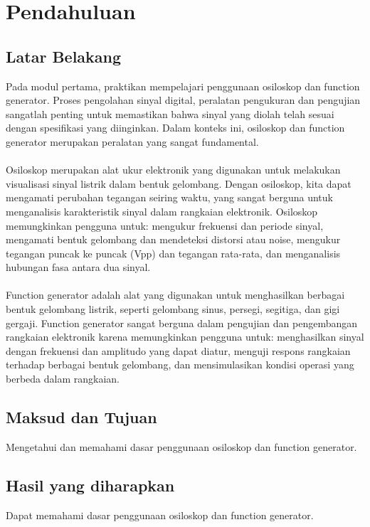 \section{Pendahuluan}
\subsection{Latar Belakang}

Pada modul pertama, praktikan mempelajari penggunaan osiloskop dan function generator.
Proses pengolahan sinyal digital, peralatan pengukuran dan pengujian sangatlah penting untuk memastikan bahwa sinyal yang diolah telah sesuai dengan spesifikasi yang diinginkan. Dalam konteks ini, osiloskop dan function generator merupakan peralatan yang sangat fundamental.
\\\\
Osiloskop merupakan alat ukur elektronik yang digunakan untuk melakukan visualisasi sinyal listrik dalam bentuk gelombang. Dengan osiloskop, kita dapat mengamati perubahan tegangan seiring waktu, yang sangat berguna untuk menganalisis karakteristik sinyal dalam rangkaian elektronik.
Osiloskop memungkinkan pengguna untuk: mengukur frekuensi dan periode sinyal, mengamati bentuk gelombang dan mendeteksi distorsi atau noise, mengukur tegangan puncak ke puncak (Vpp) dan tegangan rata-rata, dan menganalisis hubungan fasa antara dua sinyal.
\\\\
Function generator adalah alat yang digunakan untuk menghasilkan berbagai bentuk gelombang listrik, seperti gelombang sinus, persegi, segitiga, dan gigi gergaji. 
Function generator sangat berguna dalam pengujian dan pengembangan rangkaian elektronik karena memungkinkan pengguna untuk: menghasilkan sinyal dengan frekuensi dan amplitudo yang dapat diatur, menguji respons rangkaian terhadap berbagai bentuk gelombang, dan mensimulasikan kondisi operasi yang berbeda dalam rangkaian.

\subsection{Maksud dan Tujuan}
Mengetahui dan memahami dasar penggunaan osiloskop dan function generator.

\subsection{Hasil yang diharapkan}
Dapat memahami dasar penggunaan osiloskop dan function generator.


